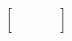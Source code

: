\documentclass[preview]{standalone}
\begin{document}
\begin{align*}
\begin{bmatrix} {} & {} & {} & {} \\ {} & {} & {} & {} \\ {} & {} & {} & {} \\ {} & {} & {} & {} \end{bmatrix}
\end{align*}
\end{document}
